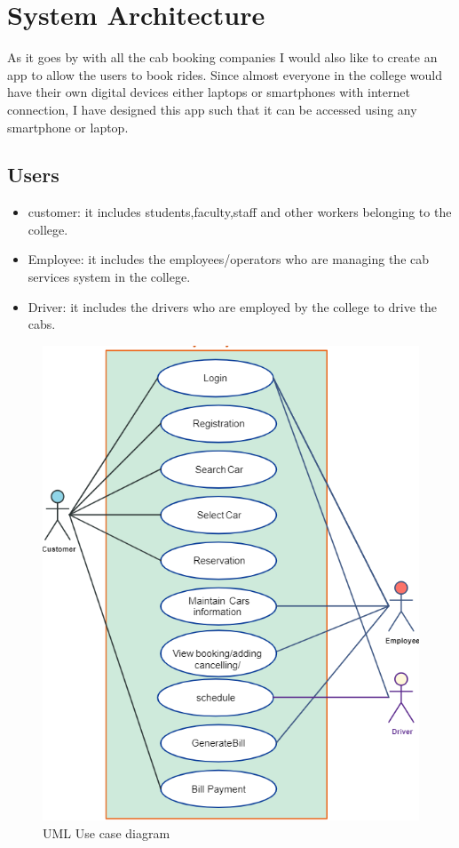 \documentclass[conference]{IEEEtran}
\begin{document}
\section{System Architecture}
As it goes by with all the cab booking companies I would also like to create an app to allow the users to book rides. Since almost everyone in the college would have their own digital devices either laptops or smartphones with internet connection, I have designed this app such that it can be accessed using any smartphone or laptop.

\subsection{Users}
\begin{itemize}
\item customer: it includes students,faculty,staff and other workers belonging to the  college.
\item Employee: it includes the employees/operators who are managing the cab services system in the college.
\item Driver: it includes the drivers who are employed by the college to drive the cabs. 
\end{itemize}
\begin{figure}[htbp]
\centerline{\includegraphics[scale=0.75]{usecase.png}}
\caption{UML Use case diagram}
\label{fig}
\end{figure}
\end{document}

